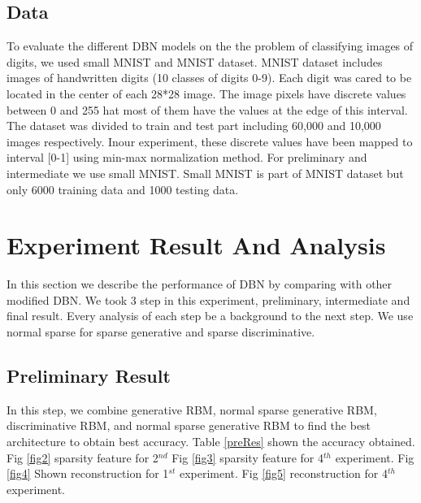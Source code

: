 \documentclass[conference]{IEEEtran}
\begin{document}
\subsection{Data}
To evaluate the different DBN models on the the problem
of classifying images of digits, we used small MNIST and MNIST dataset.
MNIST dataset includes images of handwritten digits\cite{lecun} (10
classes of digits 0-9). Each digit was cared to be located in the
center of each 28*28 image. The image pixels have discrete
values between 0 and 255 hat most of them have the values at
the edge of this interval. The dataset was divided to train and
test part including 60,000 and 10,000 images respectively. Inour experiment, these discrete values have been mapped to
interval [0-1] using min-max normalization method. For
preliminary and intermediate we use small MNIST. Small
MNIST is part of MNIST dataset but only 6000 training data
and 1000 testing data.
\section{Experiment Result And Analysis}
In this section we describe the performance of DBN by
comparing with other modified DBN. We took 3 step in this
experiment, preliminary, intermediate and final result. Every
analysis of each step be a background to the next step. We use
normal sparse for sparse generative and sparse discriminative.
\subsection{Preliminary Result}
In this step, we combine generative RBM, normal sparse
generative RBM, discriminative RBM, and normal sparse
generative RBM to find the best architecture to obtain best
accuracy. Table \ref{preRes} shown the accuracy obtained. Fig \ref{fig2} sparsity feature for 2$^{nd}$ Fig \ref{fig3} sparsity feature for 4$^{th}$ experiment. Fig \ref{fig4} Shown reconstruction for 1$^{st}$ experiment. Fig \ref{fig5} reconstruction for
4$^{th}$ experiment.
\end{document}
